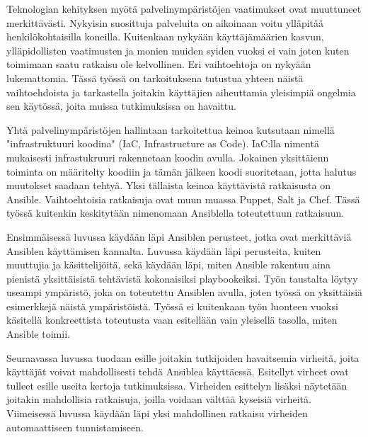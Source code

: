 Teknologian kehityksen myötä palvelinympäristöjen vaatimukset ovat muuttuneet merkittävästi.
Nykyisin suosittuja palveluita on aikoinaan voitu ylläpitää henkilökohtaisilla koneilla.
Kuitenkaan nykyään käyttäjämäärien kasvun, ylläpidollisten vaatimusten ja monien muiden
syiden vuoksi ei vain joten kuten toimimaan saatu ratkaisu ole kelvollinen. Eri vaihtoehtoja on
nykyään lukemattomia. Tässä työssä on tarkoituksena tutustua yhteen näistä vaihtoehdoista
ja tarkastella joitakin käyttäjien aiheuttamia yleisimpiä ongelmia sen käytössä, joita muissa
tutkimuksissa on havaittu.

Yhtä palvelinympäristöjen hallintaan tarkoitettua keinoa kutsutaan nimellä "infrastruktuuri
koodina" (IaC, Infrastructure as Code). IaC:lla nimentä mukaisesti infrastukruuri rakennetaan
koodin avulla. Jokainen yksittäienn toiminta on määritelty koodiin ja tämän jälkeen koodi
suoritetaan, jotta halutus muutokset saadaan tehtyä. Yksi tällaista keinoa käyttävistä
ratkaisusta on Ansible. Vaihtoehtoisia ratkaisuja ovat muun muassa Puppet, Salt ja Chef.
Tässä työssä kuitenkin keskitytään nimenomaan Ansiblella toteutettuun ratkaisuun.

Ensimmäisessä luvussa käydään läpi Ansiblen perusteet, jotka ovat merkittäviä Ansiblen
käyttämisen kannalta. Luvussa käydään läpi perusteita, kuiten muuttujia ja käsittelijöitä,
sekä käydään läpi, miten Ansible rakentuu aina pienistä yksittäisistä tehtävistä kokonaisiksi
playbookeiksi. Työn taustalta löytyy useampi ympäristö, joka on toteutettu Ansiblen avulla,
joten työssä on yksittäisiä esimerkkejä näistä ympäristöistä. Työssä ei kuitenkaan työn
luonteen vuoksi käsitellä konkreettista toteutusta vaan esitellään vain yleisellä tasolla,
miten Ansible toimii.

Seuraavassa luvussa tuodaan esille joitakin tutkijoiden havaitsemia virheitä, joita käyttäjät
voivat mahdollisesti tehdä Ansiblea käyttäessä. Esitellyt virheet ovat tulleet esille useita
kertoja tutkimuksissa. Virheiden esittelyn lisäksi näytetään joitakin mahdollisia ratkaisuja,
joilla voidaan välttää kyseisiä virheitä. Viimeisessä luvussa käydään läpi yksi mahdollinen
ratkaisu virheiden automaattiseen tunnistamiseen.
